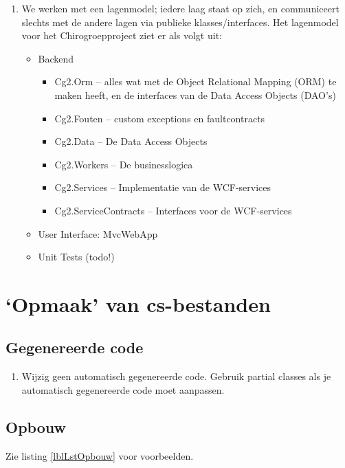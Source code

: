 \documentclass[a4paper,11pt]{article}
\begin{document}
\begin{enumerate}
\item We werken met een lagenmodel; iedere laag staat op zich, en communiceert slechts met de
andere lagen via publieke klasses/interfaces.  Het lagenmodel voor
het Chirogroepproject ziet er als volgt uit:
\begin{itemize}
\item Backend
\begin{itemize}
\item Cg2.Orm -- alles wat met de Object Relational Mapping (ORM) te maken heeft, en de interfaces van de Data Access Objects (DAO's)
\item Cg2.Fouten -- custom exceptions en faultcontracts
\item Cg2.Data -- De Data Access Objects
\item Cg2.Workers -- De businesslogica
\item Cg2.Services -- Implementatie van de WCF-services
\item Cg2.ServiceContracts -- Interfaces voor de WCF-services
\end{itemize}
\item User Interface: MvcWebApp
\item Unit Tests (todo!)
\end{itemize}
\end{enumerate}

\section{`Opmaak' van cs-bestanden}

\subsection{Gegenereerde code}

\begin{enumerate}[resume]
\item Wijzig geen automatisch gegenereerde code.  Gebruik partial classes als je automatisch
gegenereerde code moet aanpassen.
\end{enumerate}

\subsection{Opbouw}

Zie listing \ref{lblLstOpbouw} voor voorbeelden.
\end{document}
